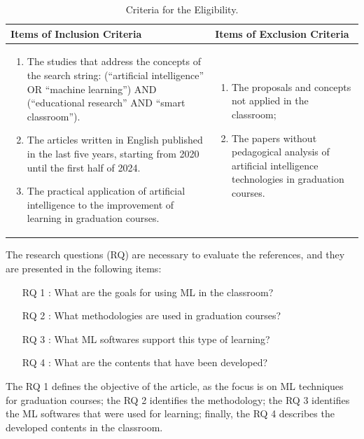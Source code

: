 \documentclass[english]{textolivre}
\begin{document}
\begin{table}[ht]
\centering
\begin{threeparttable}
\caption{Criteria for the Eligibility.}
\label{tab01}
\begin{tabular}{
>{\raggedright\arraybackslash}p{} 
>{\raggedright\arraybackslash}p{}
}
\toprule
Items of Inclusion Criteria & Items of Exclusion Criteria \\
\midrule
\begin{enumerate}[label=\alph*)]
    \item The studies that address the concepts of the search string: (“artificial intelligence” OR “machine learning”) AND (“educational research” AND “smart classroom”).
    \item The articles written in English published in the last five years, starting from 2020 until the first half of 2024.
    \item The practical application of artificial intelligence to the improvement of learning in graduation courses.
\end{enumerate} &
\begin{enumerate}[label=\alph*)]
    \item The proposals and concepts not applied in the classroom;
    \item The papers without pedagogical analysis of artificial intelligence technologies in graduation courses.
\end{enumerate}
 \\
\bottomrule
\end{tabular}
\end{threeparttable}
\end{table}

The research questions (RQ) are necessary to evaluate the references,
and they are presented in the following items:
\begin{itemize}
    \item[RQ 1]: What are the goals for using ML in the classroom?
    \item[RQ 2]: What methodologies are used in graduation courses?
    \item[RQ 3]: What ML softwares support this type of learning?
    \item[RQ 4]: What are the contents that have been developed?
\end{itemize}
The RQ 1 defines the objective of the article, as the focus is on ML
techniques for graduation courses; the RQ 2 identifies the methodology;
the RQ 3 identifies the ML softwares that were used for learning;
finally, the RQ 4 describes the developed contents in the classroom.
\end{document}
